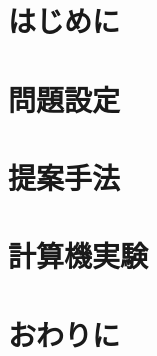 \documentclass[11pt]{jsbook}
\begin{document}
    \maketitle %
    \cleardoublepage %
    \tableofcontents %
    \thispagestyle{fancy2}
    \listoffigures %
    \thispagestyle{fancy2}
    \listoftables %
    \thispagestyle{fancy2}
    \cleardoublepage %


    \chapter{はじめに}
    \label{chap:introduction}
    

    \chapter{問題設定}
    \label{chap:setting}
    

    \chapter{提案手法}
    \label{chap:proposed}
    

    \chapter{計算機実験}
    \label{chap:experiment}
    

    \chapter{おわりに}
    \label{chap:conclusion}
    

    
    
\end{document}
